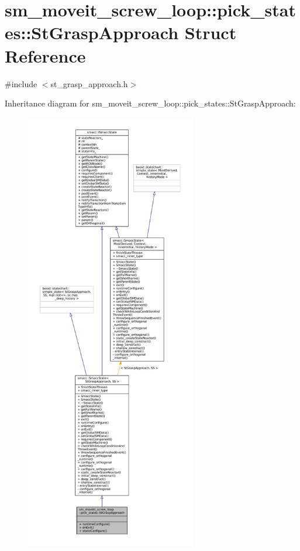 \hypertarget{structsm__moveit__screw__loop_1_1pick__states_1_1StGraspApproach}{}\section{sm\+\_\+moveit\+\_\+screw\+\_\+loop\+:\+:pick\+\_\+states\+:\+:St\+Grasp\+Approach Struct Reference}
\label{structsm__moveit__screw__loop_1_1pick__states_1_1StGraspApproach}


{\ttfamily \#include $<$st\+\_\+grasp\+\_\+approach.\+h$>$}



Inheritance diagram for sm\+\_\+moveit\+\_\+screw\+\_\+loop\+:\+:pick\+\_\+states\+:\+:St\+Grasp\+Approach\+:
\nopagebreak
\begin{figure}[H]
\begin{center}
\leavevmode
\includegraphics[height=550pt]{structsm__moveit__screw__loop_1_1pick__states_1_1StGraspApproach__inherit__graph}
\end{center}
\end{figure}



